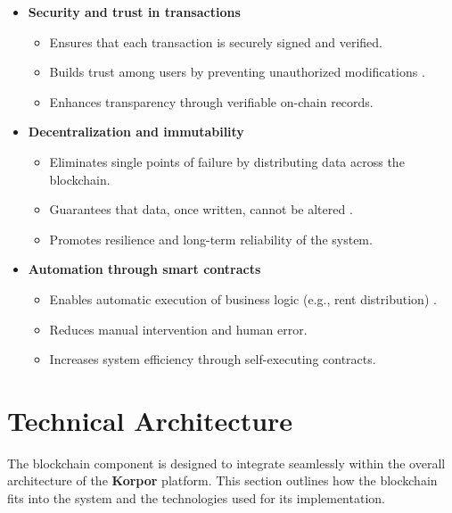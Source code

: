 \begin{itemize}
    \item \textbf{Security and trust in transactions}
    \begin{itemize}
        \item Ensures that each transaction is securely signed and verified.
        \item Builds trust among users by preventing unauthorized modifications \cite{Zheng2018BlockchainChallenges}.
        \item Enhances transparency through verifiable on-chain records.
    \end{itemize}

    \item \textbf{Decentralization and immutability}
    \begin{itemize}
        \item Eliminates single points of failure by distributing data across the blockchain.
        \item Guarantees that data, once written, cannot be altered \cite{Antonopoulos2018MasteringEthereum}.
        \item Promotes resilience and long-term reliability of the system.
    \end{itemize}

    \item \textbf{Automation through smart contracts}
    \begin{itemize}
        \item Enables automatic execution of business logic (e.g., rent distribution) \cite{Bartoletti2017EmpiricalAnalysis}.
        \item Reduces manual intervention and human error.
        \item Increases system efficiency through self-executing contracts.
    \end{itemize}
\end{itemize}

\section{Technical Architecture}

The blockchain component is designed to integrate seamlessly within the overall architecture of the \textbf{\textcolor{primary}{Korpor}} platform. This section outlines how the blockchain fits into the system and the technologies used for its implementation.

